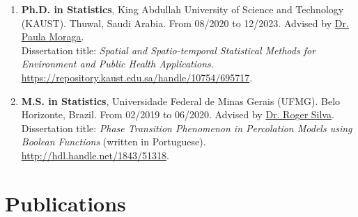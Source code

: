 \documentclass[10pt, ]{article}
\begin{document}
	\begin{enumerate}[noitemsep, topsep=0pt]
		\item \textbf{Ph.D. in Statistics}, King Abdullah University of Science and Technology (KAUST). Thuwal, Saudi Arabia. From 08/2020 to 12/2023. Advised by \href{https://www.paulamoraga.com/}{Dr. Paula Moraga}. %
		\\
		Dissertation title: \textit{Spatial and Spatio-temporal Statistical Methods for Environment and Public Health Applications}. \href{https://repository.kaust.edu.sa/handle/10754/695717}{\url{https://repository.kaust.edu.sa/handle/10754/695717}}.
		
		\item \textbf{M.S. in Statistics}, Universidade Federal de Minas Gerais (UFMG). Belo Horizonte, Brazil. From 02/2019 to 06/2020. Advised by \href{http://www.est.ufmg.br/~rogerwcs/}{Dr. Roger Silva}. %
		\\
		Dissertation title: \textit{Phase Transition Phenomenon in Percolation Models using Boolean Functions} (written in Portuguese). \href{http://hdl.handle.net/1843/51318}{\url{http://hdl.handle.net/1843/51318}}.
		
		
		
	\end{enumerate}
	
	\vspace{10pt}
	
	\vspace{-12pt}
	\section*{Publications} \vspace{-5pt}
	
\end{document}
